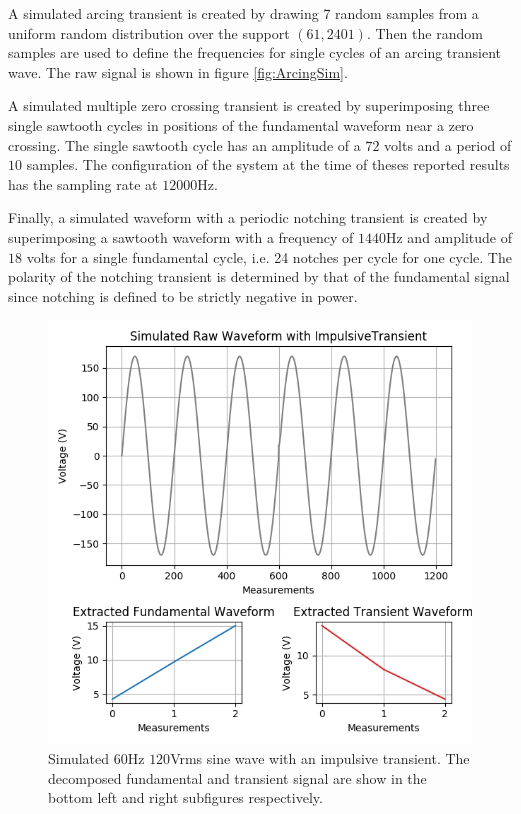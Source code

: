 \documentclass[10pt,conference,compsocconf]{IEEEtran}
\begin{document}
A simulated arcing transient is created by drawing 7 random samples from a uniform random distribution over the support $(61, 2401)$. Then the random samples are used to define the frequencies for single cycles of an arcing transient wave. The raw signal is shown in figure \ref{fig:ArcingSim}.

A simulated multiple zero crossing transient is created by superimposing three single sawtooth cycles in positions of the fundamental waveform near a zero crossing. The single sawtooth cycle has an amplitude of a $72$ volts and a period of $10$ samples. The configuration of the system at the time of theses reported results has the sampling rate at $12000$Hz. 

Finally, a simulated waveform with a periodic notching transient is created by superimposing a sawtooth waveform with a frequency of $1440$Hz and amplitude of $18$ volts for a single fundamental cycle, i.e. 24 notches per cycle for one cycle. The polarity of the notching transient is determined by that of the fundamental signal since notching is defined to be strictly negative in power.

\begin{figure}[htbp]
\centering%
\includegraphics[scale=0.35]{./figures/impulsive_sim.png}
\caption{Simulated $60$Hz $120$Vrms sine wave with an impulsive transient. The decomposed fundamental and transient signal are show in the bottom left and right subfigures respectively.}\label{fig:ImpulsiveSim}
\end{figure}
\end{document}

